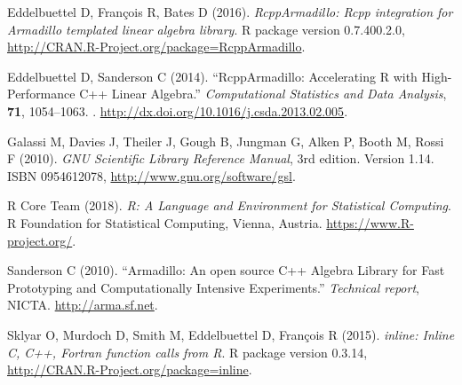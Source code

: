 \begin{thebibliography}{12}
Eddelbuettel D, Fran\c{c}ois R, Bates D (2016).
\newblock \emph{RcppArmadillo: Rcpp integration for Armadillo templated linear
  algebra library}.
\newblock R package version 0.7.400.2.0,
  \urlprefix\url{http://CRAN.R-Project.org/package=RcppArmadillo}.

Eddelbuettel D, Sanderson C (2014).
\newblock \enquote{{RcppArmadillo}: Accelerating {R} with High-Performance
  {C++} Linear Algebra.}
\newblock \emph{Computational Statistics and Data Analysis}, \textbf{71},
  1054--1063.
\newblock {}.
\newblock \urlprefix\url{http://dx.doi.org/10.1016/j.csda.2013.02.005}.

Galassi M, Davies J, Theiler J, Gough B, Jungman G, Alken P, Booth M, Rossi F
  (2010).
\newblock \emph{{GNU} {S}cientific {L}ibrary {R}eference {M}anual}, 3rd
  edition.
\newblock Version 1.14. {ISBN} 0954612078,
  \urlprefix\url{http://www.gnu.org/software/gsl}.

{R Core Team} (2018).
\newblock \emph{R: A Language and Environment for Statistical Computing}.
\newblock R Foundation for Statistical Computing, Vienna, Austria.
\newblock \urlprefix\url{https://www.R-project.org/}.

Sanderson C (2010).
\newblock \enquote{{Armadillo}: {An} open source {C++} Algebra Library for Fast
  Prototyping and Computationally Intensive Experiments.}
\newblock \emph{Technical report}, {NICTA}.
\newblock \urlprefix\url{http://arma.sf.net}.

Sklyar O, Murdoch D, Smith M, Eddelbuettel D, Fran\c{c}ois R (2015).
\newblock \emph{inline: Inline C, C++, Fortran function calls from R}.
\newblock R package version 0.3.14,
  \urlprefix\url{http://CRAN.R-Project.org/package=inline}.

\end{thebibliography}
